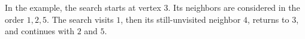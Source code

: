 In the example, the search starts at vertex $3$. Its neighbors are considered in the order $1,2,5$. The search visits $1$, then its still-unvisited neighbor $4$, returns to $3$, and continues with $2$ and $5$.
